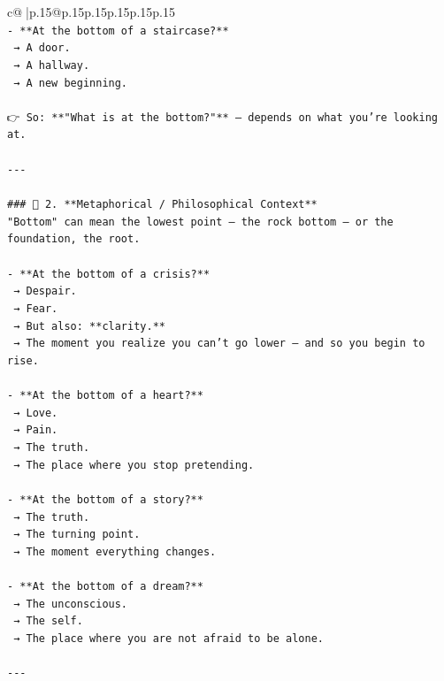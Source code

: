 \documentclass{article}
\begin{document}
{\begin{supertabular}{c@{$\;$}|p{.15\linewidth}@{}p{.15\linewidth}p{.15\linewidth}p{.15\linewidth}p{.15\linewidth}p{.15\linewidth}}
{{{\\ 
\texttt{{-} **At the bottom of a staircase?**  } \\
\texttt{  → A door.  } \\
\texttt{  → A hallway.  } \\
\texttt{  → A new beginning.} \\
\\ 
\texttt{👉 So: **"What is at the bottom?"** — depends on what you're looking at.} \\
\\ 
\texttt{{-}{-}{-}} \\
\\ 
\texttt{\#\#\# 🔹 2. **Metaphorical / Philosophical Context**  } \\
\texttt{"Bottom" can mean the lowest point — the rock bottom — or the foundation, the root.} \\
\\ 
\texttt{{-} **At the bottom of a crisis?**  } \\
\texttt{  → Despair.  } \\
\texttt{  → Fear.  } \\
\texttt{  → But also: **clarity.**  } \\
\texttt{  → The moment you realize you can’t go lower — and so you begin to rise.} \\
\\ 
\texttt{{-} **At the bottom of a heart?**  } \\
\texttt{  → Love.  } \\
\texttt{  → Pain.  } \\
\texttt{  → The truth.  } \\
\texttt{  → The place where you stop pretending.} \\
\\ 
\texttt{{-} **At the bottom of a story?**  } \\
\texttt{  → The truth.  } \\
\texttt{  → The turning point.  } \\
\texttt{  → The moment everything changes.} \\
\\ 
\texttt{{-} **At the bottom of a dream?**  } \\
\texttt{  → The unconscious.  } \\
\texttt{  → The self.  } \\
\texttt{  → The place where you are not afraid to be alone.} \\
\\ 
\texttt{{-}{-}{-}} \\
}}}
\end{supertabular}}
\end{document}
